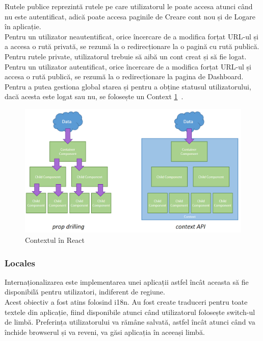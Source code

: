 Rutele publice reprezintă rutele pe care utilizatorul le poate accesa atunci când nu este autentificat, adică poate accesa paginile de Creare cont nou și de Logare în aplicație.\\

Pentru un utilizator neautentificat, orice încercare de a modifica forțat URL-ul și a accesa o rută privată, se rezumă la o redirecționare la o pagină cu rută publică.
Pentru rutele private, utilizatorul trebuie să aibă un cont creat și să fie logat. 
Pentru un utilizator autentificat, orice încercare de a modifica forțat URL-ul și accesa o rută publică, se rezumă la o redirecționare la pagina de Dashboard.\\

Pentru a putea gestiona global starea și pentru a obține statusul utilizatorului, dacă acesta este logat sau nu, se folosește un Context \ref{fig:reactContext}~\cite{ReactContext}.
\begin{figure}[h]
	\centering
	\includegraphics[width=150mm]{figs/reactContext.png}
	\caption{Contextul în React}
	\label{fig:reactContext}
\end{figure}

\subsubsection{Locales}
Internaționalizarea este implementarea unei aplicații astfel încât aceasta să fie disponibilă pentru utilizatori, indiferent de regiune.\\
Acest obiectiv a fost atins folosind i18n. Au fost create traduceri pentru toate textele din aplicație, fiind disponibile atunci când utilizatorul folosește switch-ul de limbă. 
Preferința utilizatorului va rămâne salvată, astfel încât atunci când va închide browserul și va reveni, va găsi aplicația în aceeași limbă.
\\

